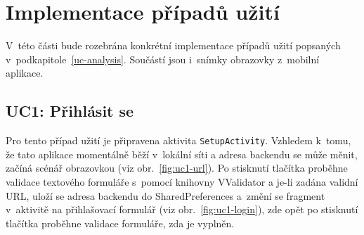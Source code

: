 \documentclass[twoside]{ctuthesis}
\begin{document}
\section{Implementace případů užití}

V~této části bude rozebrána konkrétní implementace případů užití popsaných v~podkapitole~\ref{uc-analysis}. Součástí jsou i~snímky obrazovky z~mobilní aplikace.
\newpage

\subsection{UC1: Přihlásit se}
Pro tento případ užití je připravena aktivita \texttt{SetupActivity}. Vzhledem k~tomu, že tato aplikace momentálně běží v~lokální síti a adresa backendu se může měnit, začíná scénář obrazovkou  (viz obr.~\ref{fig:uc1-url}). Po stisknutí tlačítka  proběhne validace textového formuláře s~pomocí knihovny VValidator a je-li zadána validní URL, uloží se adresa backendu do SharedPreferences a~změní se fragment v~aktivitě na přihlašovací formulář (viz obr.~\ref{fig:uc1-login}), zde opět po stisknutí tlačítka  proběhne validace formuláře, zda je vyplněn.
\end{document}
